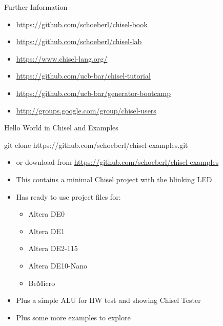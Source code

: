 \begin{frame}[fragile]{Further Information}
\begin{itemize}
\item \url{https://github.com/schoeberl/chisel-book}
\item \url{https://github.com/schoeberl/chisel-lab}
\item \url{https://www.chisel-lang.org/}
\item \url{https://github.com/ucb-bar/chisel-tutorial}
\item \url{https://github.com/ucb-bar/generator-bootcamp}
\item \url{http://groups.google.com/group/chisel-users}
\end{itemize}
\end{frame}


\begin{frame}[fragile]{Hello World in Chisel and Examples}
\begin{chisel}
git clone https://github.com/schoeberl/chisel-examples.git
\end{chisel}
\begin{itemize}
\item or download from \url{https://github.com/schoeberl/chisel-examples}
\item This contains a minimal Chisel project with the blinking LED
\item Has ready to use project files for:
\begin{itemize}
\item Altera DE0
\item Altera DE1
\item Altera DE2-115
\item Altera DE10-Nano
\item BeMicro
\end{itemize}
\item Plus a simple ALU for HW test and showing Chisel Tester
\item Plus some more examples to explore
\end{itemize}
\end{frame}

